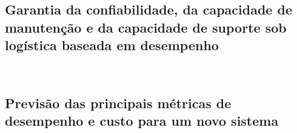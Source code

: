 \documentclass{abntex2}
\begin{document}
\begin{sloppypar}
\subsection{Garantia da confiabilidade, da capacidade de manutenção e da capacidade de suporte sob logística baseada em desempenho}\

\subsection{Previsão das principais métricas de desempenho e custo para um novo sistema}\


%





\end{sloppypar}
\end{document}
